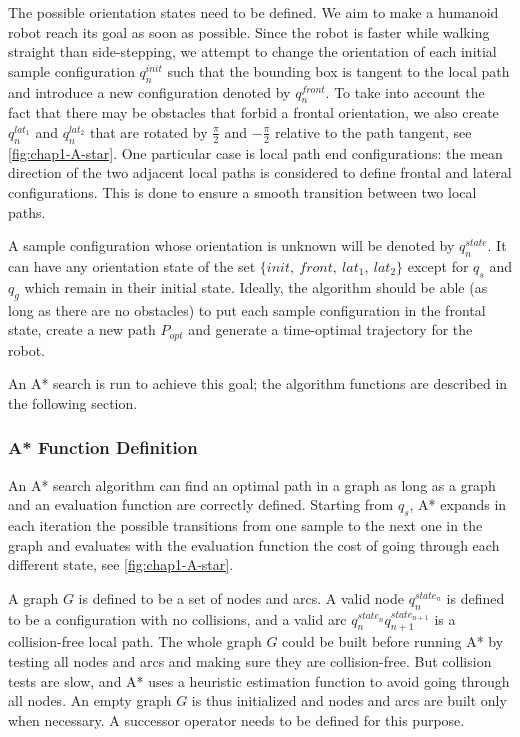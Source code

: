 The possible orientation states need to be defined. We aim to make a
humanoid robot reach its goal as soon as possible. Since the robot is
faster while walking straight than side-stepping, we attempt to change
the orientation of each initial sample configuration $q_n^{init}$ such
that the bounding box is tangent to the local path and introduce a new
configuration denoted by $q_n^{front}$. To take into account the fact
that there may be obstacles that forbid a frontal orientation, we also
create $q_n^{lat_1}$ and $q_n^{lat_2}$ that are rotated by
$\frac{\pi}{2}$ and $-\frac{\pi}{2}$ relative to the path tangent, see
\autoref{fig:chap1-A-star}. One particular case is local path end
configurations: the mean direction of the two adjacent local paths is
considered to define frontal and lateral configurations. This is done
to ensure a smooth transition between two local paths.

A sample configuration whose orientation is unknown will be denoted by
$q_n^{state}$. It can have any orientation state of the set
$\{init,~front,~lat_1,~lat_2\}$ except for $q_s$ and $q_g$ which
remain in their initial state.  Ideally, the algorithm should be able
(as long as there are no obstacles) to put each sample configuration
in the frontal state, create a new path $P_{opt}$ and generate a
time-optimal trajectory for the robot.

An A* search is run to achieve this goal; the algorithm functions are
described in the following section.

\subsubsection{A* Function Definition}
\label{sec:chap1-A-star}
An A* search algorithm can find an optimal path in a graph
as long as a graph and an evaluation function are correctly
defined. Starting from $q_s$, A* expands in each iteration the
possible transitions from one sample to the next one in the graph and
evaluates with the evaluation function the cost of going through each
different state, see \autoref{fig:chap1-A-star}.

A graph $G$ is defined to be a set of nodes and arcs. A valid node
$q_n^{state_n}$ is defined to be a configuration with no collisions, and a valid arc
$q_n^{state_n}q_{n+1}^{state_{n+1}}$ is a collision-free local
path. The whole graph $G$ could be built before running A* by testing
all nodes and arcs and making sure they are collision-free. But
collision tests are slow, and A* uses a heuristic estimation function
to avoid going through all nodes. An empty graph $G$ is thus
initialized and nodes and arcs are built only when necessary. A
successor operator needs to be defined for this purpose.

